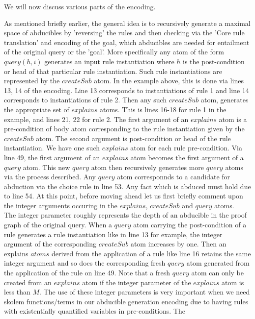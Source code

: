 \documentclass[sigconf]{acmart}
\begin{document}
We will now discuss various parts of the encoding.

As mentioned briefly earlier, the general idea is to recursively generate a
maximal space of abducibles by 'reversing' the rules and then checking via the
'Core rule translation' and encoding of the goal, which abducibles are needed
for entailment of the original query or the 'goal'. More specifically any atom
of the form $query(h,i)$ generates an input rule instantiation where $h$ is
the post-condition or head of that particular rule instantiation. Such rule
instantiations are represented by the $createSub$ atom. In the example above,
this is done via lines 13, 14 of the encoding. Line 13 corresponds to
instantiations of rule 1 and line 14 corresponds to instantiations of rule
2. Then any such $createSub$ atom, generates the appropriate set of $explains$
atoms. This is lines 16-18 for rule 1 in the example, and lines 21, 22 for
rule 2. The first argument of an $explains$ atom is a pre-condition of body
atom corresponding to the rule instantiation given by the $createSub$
atom. The second argument is post-condition or head of the rule
instantiation. We have one such $explains$ atom for each rule
pre-condition. Via line 49, the first argument of an $explains$ atom becomes
the first argument of a $query$ atom. This new $query$ atom then recursively
generates more $query$ atoms via the process described. Any $query$ atom
corresponnds to a candidate for abduction via the choice rule in line 53. Any
fact which is abduced must hold due to line 54. At this point, before moving
ahead let us first briefly comment upon the integer arguments occuring in the
$explains$, $createSub$ and $query$ atoms.\\ The integer parameter roughly
represents the depth of an abducible in the proof graph of the original
query. When a $query$ atom carrying the post-condition of a rule generates a
rule instantiation like in line 13 for example, the integer argument of the
corresponding $createSub$ atom increases by one. Then an explains $atoms$
derived from the application of a rule like line 16 retains the same integer
argument and so does the corresponding fresh $query$ atom generated from the
application of the rule on line 49. Note that a fresh $query$ atom can only be
created from an $explains$ atom if the integer parameter of the $explains$
atom is less than $M$. The use of these integer parameters is very important
when we need skolem functions/terms in our abducible generation encoding due
to having rules with existentially quantified variables in pre-conditions. The
\end{document}
